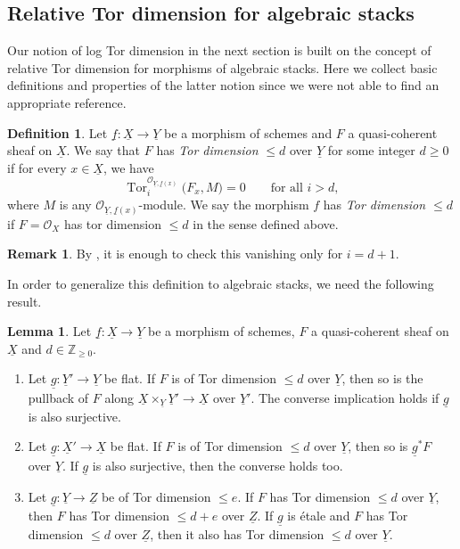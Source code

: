 \documentclass[11pt]{amsart}
\theoremstyle{definition}
\theoremstyle{definition}
\newtheorem{lemma}[theorem]{Lemma}
\newtheorem{remark}[theorem]{Remark}
\newtheorem{definition}[theorem]{Definition}
\newcommand{\ul}[1]{\underline{#1}}
\begin{document}
\subsection{Relative Tor dimension for algebraic stacks}\label{relative Tor dimension}
Our notion of log Tor dimension in the next section is built on the concept of relative Tor dimension for morphisms of algebraic stacks. Here we collect basic definitions and properties of the latter notion since we were not able to find an appropriate reference.
\begin{definition}\label{Definition-of-relative-Tor dimension}
Let $\underline{f}\colon \underline{X}\rightarrow \underline{Y}$ be a morphism of schemes and $F$ a quasi-coherent sheaf on $\underline{X}$. We say that $F$ has \emph{Tor dimension} $\leq d$ over $\underline{Y}$ for some integer $d\geq 0$ if for every $x\in \underline{X}$, we have
\[
\operatorname{Tor}^{\mathcal{O}_{\underline{Y},\ul{f}(x)}}_i\!\bigl(F_x,M) = 0 \qquad \text{for all } i > d,
\]
where $M$ is any $\mathcal{O}_{\underline{Y},\ul{f}(x)}$-module. We say the morphism $f$ has \textit{Tor dimension $\leq d$} if $F= \mathcal{O}_X$ has tor dimension $\leq d$ in the sense defined above.
\end{definition}
\begin{remark}
    By \cite[fd Lemma 4.1.10]{WeibelHomAlg}, it is enough to check this vanishing only for $i=d+1$.
\end{remark}
In order to generalize this definition to algebraic stacks, we need the following result.
\begin{lemma}\label{lemma: nice properties of rel Tor dim}
    Let $\underline{f}\colon \underline{X}\rightarrow \underline{Y}$ be a morphism of schemes, $F$ a quasi-coherent sheaf on $\underline{X}$ and $d\in\mathbb{Z}_{\geq 0}$.
\begin{enumerate}
    \item\label{item: rel Tor stacks cover target} Let $\underline{g}: \underline{Y}'\rightarrow \underline{Y}$ be flat. If $F$ is of Tor dimension $\leq d$ over $\underline{Y}$, then so is the pullback of $F$ along $\underline{X}\times_{\underline{Y}} \underline{Y}'\rightarrow \underline{X}$ over $\underline{Y}'$. The converse implication holds if $\underline{g}$ is also surjective.
    \item\label{item: rel Tor stacks cover source} Let $\underline{g}\colon \underline{X}'\rightarrow \underline{X}$ be flat. If $F$ is of Tor dimension $\leq d$ over $\underline{Y}$, then so is $\ul{g}^*F$ over $\underline{Y}$. If $\underline{g}$ is also surjective, then the converse holds too. 
    \item\label{item: rel Tor stacks etale} Let $\underline{g}\colon \underline{Y}\rightarrow \underline{Z}$ be of Tor dimension $\leq e$. If $F$ has Tor dimension $\leq d$ over $\underline{Y}$, then $F$ has Tor dimension $\leq d+e$ over $\underline{Z}$. If $\underline{g}$ is \'etale and $F$ has Tor dimension $\leq d$ over $\underline{Z}$, then it also has Tor dimension $\leq d$ over $\underline{Y}$.
\end{enumerate}
\end{lemma}
\end{document}
